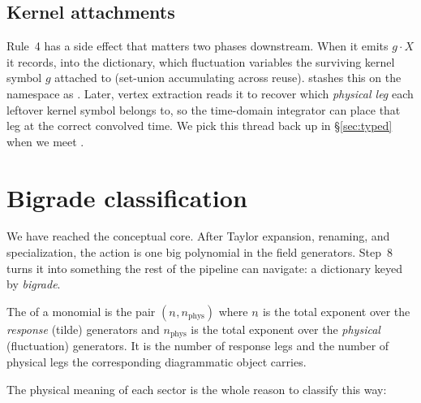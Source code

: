 \subsection{Kernel attachments}

Rule~4 has a side effect that matters two phases downstream. When it emits
$g\cdot X$ it records, into the  dictionary, which
fluctuation variables the surviving kernel symbol $g$ attached to (set-union
accumulating across reuse).  stashes this on the namespace as
. Later, vertex extraction reads it to recover which
\emph{physical leg} each leftover kernel symbol belongs to, so the time-domain
integrator can place that leg at the correct convolved time. We pick this thread
back up in \S\ref{sec:typed} when we meet .

\section{Bigrade classification}\label{sec:bigrade}

We have reached the conceptual core. After Taylor expansion, renaming, and
specialization, the action is one big polynomial in the field generators. Step~8
turns it into something the rest of the pipeline can navigate: a dictionary keyed
by \emph{bigrade}.

\begin{defn}
The  of a monomial is the pair
$(n_{\tilde{}}, n_{\mathrm{phys}})$ where $n_{\tilde{}}$ is the total exponent over
the \emph{response} (tilde) generators and $n_{\mathrm{phys}}$ is the total exponent
over the \emph{physical} (fluctuation) generators. It is the number of response legs
and the number of physical legs the corresponding diagrammatic object carries.
\end{defn}

The physical meaning of each sector is the whole reason to classify this way:

